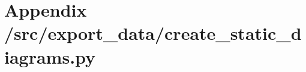\section{Appendix /src/export\_data/create\_static\_diagrams.py}\label{app:create_static_diagrams.py}
